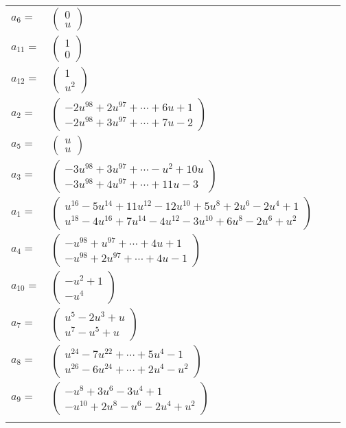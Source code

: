 \documentclass[1p]{elsarticle_modified}
\theoremstyle{definition}
\begin{document}
\begin{tabular}{m{7pt} m{180pt} m{7pt} m{180pt} }
\flushright $a_{6}=$&$\begin{pmatrix}0\\u\end{pmatrix}$ \\
\flushright $a_{11}=$&$\begin{pmatrix}1\\0\end{pmatrix}$ \\
\flushright $a_{12}=$&$\begin{pmatrix}1\\u^2\end{pmatrix}$ \\
\flushright $a_{2}=$&$\begin{pmatrix}-2 u^{98}+2 u^{97}+\cdots+6 u+1\\-2 u^{98}+3 u^{97}+\cdots+7 u-2\end{pmatrix}$ \\
\flushright $a_{5}=$&$\begin{pmatrix}u\\u\end{pmatrix}$ \\
\flushright $a_{3}=$&$\begin{pmatrix}-3 u^{98}+3 u^{97}+\cdots- u^2+10 u\\-3 u^{98}+4 u^{97}+\cdots+11 u-3\end{pmatrix}$ \\
\flushright $a_{1}=$&$\begin{pmatrix}u^{16}-5 u^{14}+11 u^{12}-12 u^{10}+5 u^8+2 u^6-2 u^4+1\\u^{18}-4 u^{16}+7 u^{14}-4 u^{12}-3 u^{10}+6 u^8-2 u^6+u^2\end{pmatrix}$ \\
\flushright $a_{4}=$&$\begin{pmatrix}- u^{98}+u^{97}+\cdots+4 u+1\\- u^{98}+2 u^{97}+\cdots+4 u-1\end{pmatrix}$ \\
\flushright $a_{10}=$&$\begin{pmatrix}- u^2+1\\- u^4\end{pmatrix}$ \\
\flushright $a_{7}=$&$\begin{pmatrix}u^5-2 u^3+u\\u^7- u^5+u\end{pmatrix}$ \\
\flushright $a_{8}=$&$\begin{pmatrix}u^{24}-7 u^{22}+\cdots+5 u^4-1\\u^{26}-6 u^{24}+\cdots+2 u^4- u^2\end{pmatrix}$ \\
\flushright $a_{9}=$&$\begin{pmatrix}- u^8+3 u^6-3 u^4+1\\- u^{10}+2 u^8- u^6-2 u^4+u^2\end{pmatrix}$\\&\end{tabular}
\end{document}
